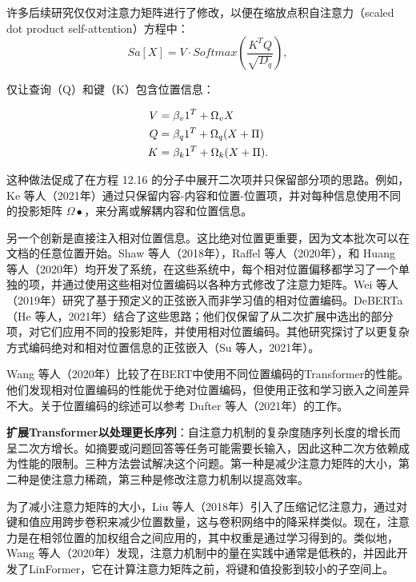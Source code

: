\documentclass[lang=cn,newtx,10pt,scheme=chinese]{elegantbook}
\begin{document}
许多后续研究仅仅对注意力矩阵进行了修改，以便在缩放点积自注意力（scaled dot product self-attention）方程中：
\begin{equation}
Sa[X] = V \cdot Softmax\left( \frac{K^TQ}{\sqrt{D_q}} \right),  
\end{equation}

仅让查询（Q）和键（K）包含位置信息：


\begin{align}
V &= \beta_v 1^T + \Omega_v X \notag \\
Q &= \beta_q 1^T + \Omega_q (X + \Pi) \notag \\
K &= \beta_k 1^T + \Omega_k (X + \Pi). 
\end{align} 

这种做法促成了在方程 12.16 的分子中展开二次项并只保留部分项的思路。例如，Ke 等人（2021年）通过只保留内容-内容和位置-位置项，并对每种信息使用不同的投影矩阵 \(\Omega •\)，来分离或解耦内容和位置信息。

另一个创新是直接注入相对位置信息。这比绝对位置更重要，因为文本批次可以在文档的任意位置开始。Shaw 等人（2018年），Raffel 等人（2020年），和 Huang 等人（2020年）均开发了系统，在这些系统中，每个相对位置偏移都学习了一个单独的项，并通过使用这些相对位置编码以各种方式修改了注意力矩阵。Wei 等人（2019年）研究了基于预定义的正弦嵌入而非学习值的相对位置编码。DeBERTa（He 等人，2021年）结合了这些思路；他们仅保留了从二次扩展中选出的部分项，对它们应用不同的投影矩阵，并使用相对位置编码。其他研究探讨了以更复杂方式编码绝对和相对位置信息的正弦嵌入（Su 等人，2021年）。

Wang 等人（2020年）比较了在BERT中使用不同位置编码的Transformer的性能。他们发现相对位置编码的性能优于绝对位置编码，但使用正弦和学习嵌入之间差异不大。关于位置编码的综述可以参考 Dufter 等人（2021年）的工作。

\textbf{扩展Transformer以处理更长序列}：自注意力机制的复杂度随序列长度的增长而呈二次方增长。如摘要或问题回答等任务可能需要长输入，因此这种二次方依赖成为性能的限制。三种方法尝试解决这个问题。第一种是减少注意力矩阵的大小，第二种是使注意力稀疏，第三种是修改注意力机制以提高效率。

为了减小注意力矩阵的大小，Liu 等人（2018年）引入了压缩记忆注意力，通过对键和值应用跨步卷积来减少位置数量，这与卷积网络中的降采样类似。现在，注意力是在相邻位置的加权组合之间应用的，其中权重是通过学习得到的。类似地，Wang 等人（2020年）发现，注意力机制中的量在实践中通常是低秩的，并因此开发了LinFormer，它在计算注意力矩阵之前，将键和值投影到较小的子空间上。
\end{document}
